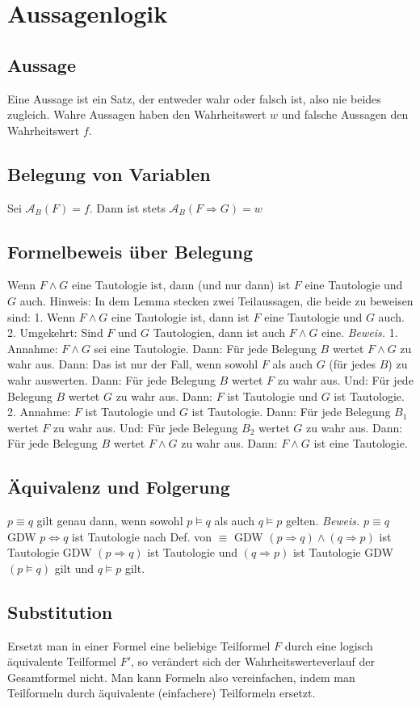 \section{Aussagenlogik}
\subsection*{Aussage}
Eine Aussage ist ein Satz, der entweder wahr oder falsch ist, also nie beides zugleich.
Wahre Aussagen haben den Wahrheitswert $w$ und falsche Aussagen den
Wahrheitswert $f$.
\subsection*{Belegung von Variablen}
Sei $\mathcal{A}_B(F) = f$.
Dann ist stets $\mathcal{A}_B(F\Rightarrow G) = w$
\subsection*{Formelbeweis über Belegung}
Wenn $F \wedge G$ eine Tautologie ist, dann (und nur dann) ist $F$ eine Tautologie und $G$ auch.
Hinweis: In dem Lemma stecken zwei Teilaussagen, die beide zu beweisen sind:
1. Wenn $F \wedge G$ eine Tautologie ist, dann ist $F$ eine Tautologie und $G$ auch.
2. Umgekehrt: Sind $F$ und $G$ Tautologien, dann ist auch $F \wedge G$ eine.
\emph{Beweis.}
1. Annahme: $F \wedge G$ sei eine Tautologie.
Dann: Für jede Belegung $B$ wertet $F \wedge G$ zu wahr aus.
Dann: Das ist nur der Fall, wenn sowohl $F$ als auch $G$ (für jedes $B$) zu wahr auswerten.
Dann: Für jede Belegung $B$ wertet $F$ zu wahr aus. Und:
Für jede Belegung $B$ wertet $G$ zu wahr aus.
Dann: $F$ ist Tautologie und $G$ ist Tautologie.
2. Annahme: $F$ ist Tautologie und $G$ ist Tautologie.
Dann: Für jede Belegung $B_1$ wertet $F$ zu wahr aus. Und: Für jede Belegung $B_2$ wertet $G$ zu wahr aus.
Dann: Für jede Belegung $B$ wertet $F \wedge G$ zu wahr aus.
Dann: $F \wedge G$ ist eine Tautologie.
\subsection*{Äquivalenz und Folgerung}
$p\equiv q$ gilt genau dann, wenn sowohl $p\models q$ als auch $q\models p$ gelten. \emph{Beweis.}
$p\equiv q$ GDW $p\Leftrightarrow q$ ist Tautologie nach Def. von $\equiv$
GDW $(p\Rightarrow q) \wedge (q\Rightarrow p)$ ist Tautologie
GDW $(p\Rightarrow q)$ ist Tautologie und $(q\Rightarrow p)$ ist Tautologie
GDW $(p\models q)$ gilt und $q\models p$ gilt.
\subsection*{Substitution}
Ersetzt man in einer Formel eine beliebige Teilformel $F$ durch eine logisch äquivalente
Teilformel $F'$, so verändert sich der Wahrheitswerteverlauf der Gesamtformel nicht.
Man kann Formeln also vereinfachen, indem man Teilformeln durch äquivalente
(einfachere) Teilformeln ersetzt.
